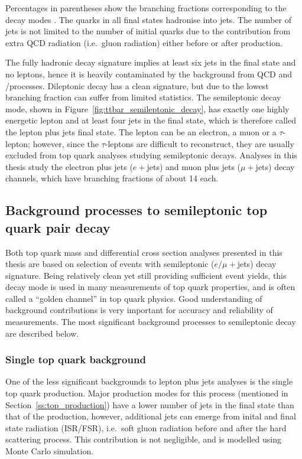 Percentages in parentheses show the branching fractions corresponding to the decay modes \autocite{PDG}. The quarks in
all final states hadronise into jets. The number of jets is not limited to the number of initial quarks due to the
contribution from extra QCD radiation (i.e.\ gluon radiation) either before or after \ttbar production.

The fully hadronic \ttbar decay signature implies at least six jets in the final state and no leptons, hence it is
heavily contaminated by the background from QCD and \W/\ZpJets processes. Dileptonic \ttbar decay has a clean signature,
but due to the lowest branching fraction can suffer from limited statistics. The semileptonic decay mode, shown in
Figure~\ref{fig:ttbar_semileptonic_decay}, has exactly one highly energetic lepton and at least four jets in the final
state, which is therefore called the lepton plus jets final state. The lepton can be an electron, a muon or a
$\tau$-lepton; however, since the $\tau$-leptons are difficult to reconstruct, they are usually excluded from top quark
analyses studying semileptonic decays. Analyses in this thesis study the electron plus jets ($e+$jets) and muon plus
jets ($\mu+$jets) decay channels, which have branching fractions of about \SI{14}{\pc} each.



\newpage
\subsection{Background processes to semileptonic top quark pair decay}
\label{ss:backgrounds}
Both top quark mass and differential cross section analyses presented in this thesis are based on selection of events
with semileptonic ($e/\mu+$jets) \ttbar decay signature. Being relatively clean yet still providing sufficient event
yields, this decay mode is used in many measurements of top quark properties, and is often called a ``golden channel''
in top quark physics. Good understanding of background contributions is very important for accuracy and reliability of
measurements. The most significant background processes to semileptonic \ttbar decay are described below.

\subsubsection*{Single top quark background}
One of the less significant backgrounds to lepton plus jets analyses is the single top quark production. Major
production modes for this process (mentioned in Section~\ref{ss:top_production}) have a lower number of jets in the
final state than that of the \ttbar production, however, additional jets can emerge from inital and final state
radiation (ISR/FSR), i.e.\ soft gluon radiation before and after the hard scattering process. This contribution is not
negligible, and is modelled using Monte Carlo simulation.

